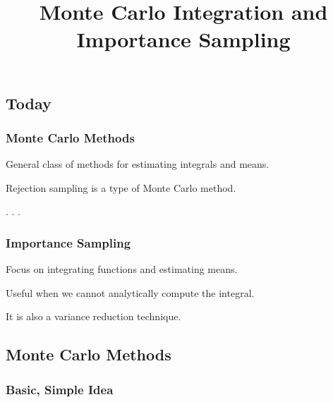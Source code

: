 \documentclass[
  letterpaper,
  DIV=11,
  numbers=noendperiod]{scrartcl}
\title{Monte Carlo Integration and Importance Sampling}
\author{}
\date{}
\begin{document}
\maketitle


\DeclareMathOperator*{\argmin}{\arg\,\min}
\DeclareMathOperator*{\argmax}{\arg\,\max}
\DeclareMathOperator*{\minimize}{minimize}
\DeclareMathOperator{\kl}{KL}
\DeclareMathOperator{\var}{Var}
\DeclareMathOperator{\cov}{Cov}
\DeclareMathOperator{\normal}{\mathcal{N}}
\DeclareMathOperator{\binomial}{Bin}
\DeclareMathOperator{\uniform}{\mathcal{U}}
\newcommand{\E}{\operatorname{E}}

\subsection{Today}\label{today}

\subsubsection{Monte Carlo Methods}\label{monte-carlo-methods}

General class of methods for estimating integrals and means.

\medskip\pause

Rejection sampling is a type of Monte Carlo method.

. . .

\subsubsection{Importance Sampling}\label{importance-sampling}

Focus on integrating functions and estimating means.

\medskip\pause

Useful when we cannot analytically compute the integral.

\medskip\pause

It is also a variance reduction technique.

\subsection{Monte Carlo Methods}\label{monte-carlo-methods-1}

\subsubsection{Basic, Simple Idea}\label{basic-simple-idea}
\end{document}
